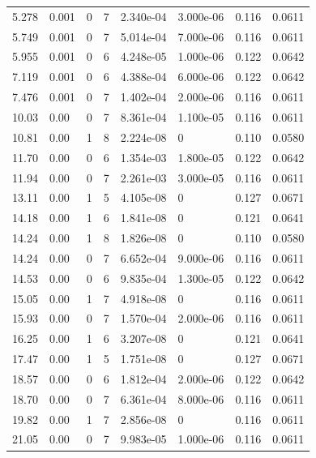 \documentclass[preview]{standalone}
\begin{document}
{{\begin{tabular}{L{1.2cm}C{1.2cm} C{0.3cm}C{0.5cm} C{1.4cm}C{1.4cm} C{1.4cm}C{1.4cm}}
  5.278  &  0.001  & 0     &  7 &  2.340e-04  & 3.000e-06  & 0.116 &  0.0611   \\ 
  5.749  &  0.001  & 0     &  7 &  5.014e-04  & 7.000e-06  & 0.116 &  0.0611   \\ 
  5.955  &  0.001  & 0     &  6 &  4.248e-05  & 1.000e-06  & 0.122 &  0.0642   \\ 
  7.119  &  0.001  & 0     &  6 &  4.388e-04  & 6.000e-06  & 0.122 &  0.0642   \\ 
  7.476  &  0.001  & 0     &  7 &  1.402e-04  & 2.000e-06  & 0.116 &  0.0611   \\ 
  10.03  &  0.00  & 0     &  7 &  8.361e-04  & 1.100e-05  & 0.116 &  0.0611   \\ 
  10.81  &  0.00  & 1     &  8 &  2.224e-08  & 0  & 0.110 &  0.0580   \\ 
  11.70  &  0.00  & 0     &  6 &  1.354e-03  & 1.800e-05  & 0.122 &  0.0642   \\ 
  11.94  &  0.00  & 0     &  7 &  2.261e-03  & 3.000e-05  & 0.116 &  0.0611   \\ 
  13.11  &  0.00  & 1     &  5 &  4.105e-08  & 0  & 0.127 &  0.0671   \\ 
  14.18  &  0.00  & 1     &  6 &  1.841e-08  & 0  & 0.121 &  0.0641   \\ 
  14.24  &  0.00  & 1     &  8 &  1.826e-08  & 0  & 0.110 &  0.0580   \\ 
  14.24  &  0.00  & 0     &  7 &  6.652e-04  & 9.000e-06  & 0.116 &  0.0611   \\ 
  14.53  &  0.00  & 0     &  6 &  9.835e-04  & 1.300e-05  & 0.122 &  0.0642   \\ 
  15.05  &  0.00  & 1     &  7 &  4.918e-08  & 0  & 0.116 &  0.0611   \\ 
  15.93  &  0.00  & 0     &  7 &  1.570e-04  & 2.000e-06  & 0.116 &  0.0611   \\ 
  16.25  &  0.00  & 1     &  6 &  3.207e-08  & 0  & 0.121 &  0.0641   \\ 
  17.47  &  0.00  & 1     &  5 &  1.751e-08  & 0  & 0.127 &  0.0671   \\ 
  18.57  &  0.00  & 0     &  6 &  1.812e-04  & 2.000e-06  & 0.122 &  0.0642   \\ 
  18.70  &  0.00  & 0     &  7 &  6.361e-04  & 8.000e-06  & 0.116 &  0.0611   \\ 
  19.82  &  0.00  & 1     &  7 &  2.856e-08  & 0  & 0.116 &  0.0611   \\ 
  21.05  &  0.00  & 0     &  7 &  9.983e-05  & 1.000e-06  & 0.116 &  0.0611   \\ 

\end{tabular}}}
\end{document}
